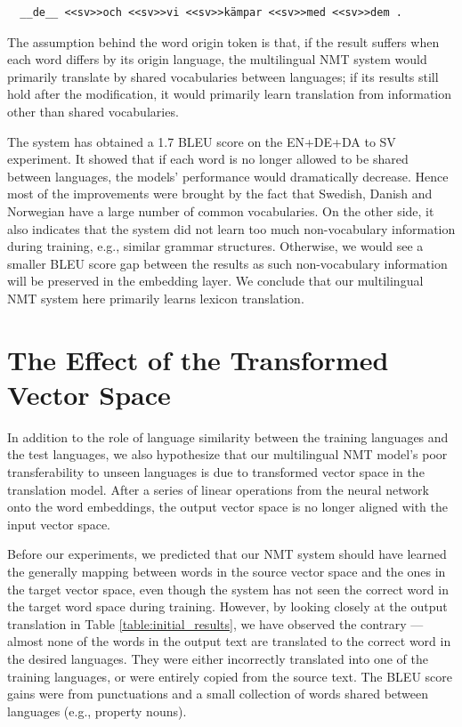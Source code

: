 \documentclass[thesis]{cluu}
\begin{document}
\begin{verbatim}
  __de__ <<sv>>och <<sv>>vi <<sv>>kämpar <<sv>>med <<sv>>dem .
\end{verbatim}

The assumption behind the word origin token is that, if the result suffers when each word differs by its origin language, the multilingual NMT system would primarily translate by shared vocabularies between languages; if its results still hold after the modification, it would primarily learn translation from information other than shared vocabularies.

The system has obtained a 1.7 BLEU score on the EN+DE+DA to SV experiment. It showed that if each word is no longer allowed to be shared between languages, the models' performance would dramatically decrease. Hence most of the improvements were brought by the fact that Swedish, Danish and Norwegian have a large number of common vocabularies. On the other side, it also indicates that the system did not learn too much non-vocabulary information during training, e.g., similar grammar structures. Otherwise, we would see a smaller BLEU score gap between the results as such non-vocabulary information will be preserved in the embedding layer. We conclude that our multilingual NMT system here primarily learns lexicon translation.

\section{The Effect of the Transformed Vector Space}

In addition to the role of language similarity between the training languages and the test languages, we also hypothesize that our multilingual NMT model's poor transferability to unseen languages is due to transformed vector space in the translation model. After a series of linear operations from the neural network onto the word embeddings, the output vector space is no longer aligned with the input vector space.

Before our experiments, we predicted that our NMT system should have learned the generally mapping between words in the source vector space and the ones in the target vector space, even though the system has not seen the correct word in the target word space during training. However, by looking closely at the output translation in Table \ref{table:initial_results}, we have observed the contrary --- almost none of the words in the output text are translated to the correct word in the desired languages. They were either incorrectly translated into one of the training languages, or were entirely copied from the source text. The BLEU score gains were from punctuations and a small collection of words shared between languages (e.g., property nouns).
\end{document}

